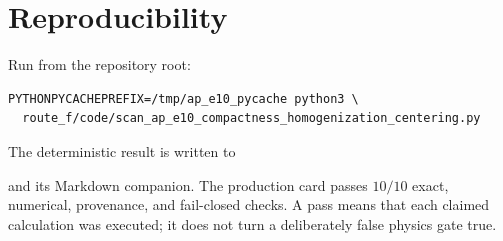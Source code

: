 \documentclass[11pt]{article}
\numberwithin{equation}{section}
\theoremstyle{definition}
\theoremstyle{remark}
\begin{document}
\section{Reproducibility}

Run from the repository root:
\begin{verbatim}
PYTHONPYCACHEPREFIX=/tmp/ap_e10_pycache python3 \
  route_f/code/scan_ap_e10_compactness_homogenization_centering.py
\end{verbatim}
The deterministic result is written to
\begin{center}
\end{center}
and its Markdown companion.  The production card passes $10/10$ exact,
numerical, provenance, and fail-closed checks.  A pass means that each claimed
calculation was executed; it does not turn a deliberately false physics gate
true.



\end{document}
